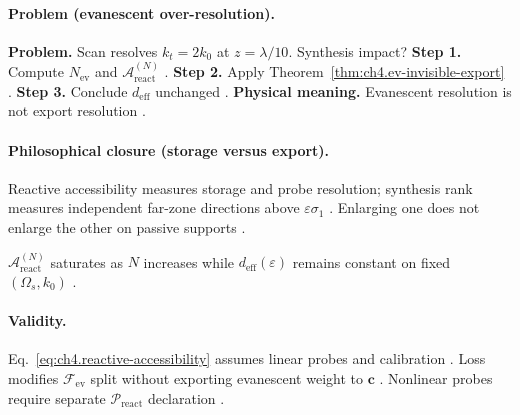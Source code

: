 \paragraph{Problem (evanescent over-resolution).}
\textbf{Problem.} Scan resolves \(k_{t}=2k_{0}\) at \(z=\lambda/10\). Synthesis impact?
\textbf{Step 1.} Compute \(N_{\mathrm{ev}}\) and \(\mathcal{A}_{\mathrm{react}}^{(N)}\) \cite{jackson1999,hansen1988}.
\textbf{Step 2.} Apply Theorem~\ref{thm:ch4.ev-invisible-export} \cite{stratton1941,harrington2001}.
\textbf{Step 3.} Conclude \(d_{\mathrm{eff}}\) unchanged \cite{devaney2004}.
\textbf{Physical meaning.} Evanescent resolution is not export resolution \cite{hansen1988}.

\paragraph{Philosophical closure (storage versus export).}
Reactive accessibility measures storage and probe resolution; synthesis rank measures independent far-zone directions above \(\varepsilon\sigma_{1}\)
\cite{stratton1941,harrington2001,jackson1999,hansen1988,devaney2004}. Enlarging one does not enlarge the other on passive supports
\cite{stratton1941,harrington2001}.

\begin{corollary}
\label{cor:ch4.reactive-saturation}
\(\mathcal{A}_{\mathrm{react}}^{(N)}\) saturates as \(N\) increases while \(d_{\mathrm{eff}}(\varepsilon)\) remains constant on fixed \((\Omega_{s},k_{0})\)
\cite{harrington2001,devaney2004,hansen1988,stratton1941}.
\end{corollary}

\paragraph{Validity.}
Eq.~\eqref{eq:ch4.reactive-accessibility} assumes linear probes and calibration \cite{harrington2001}. Loss modifies \(\mathcal{F}_{\mathrm{ev}}\) split
without exporting evanescent weight to \(\mathbf{c}\) \cite{stratton1941,devaney2004}. Nonlinear probes require separate \(\mathcal{P}_{\mathrm{react}}\) declaration
\cite{hansen1988,jackson1999}.
